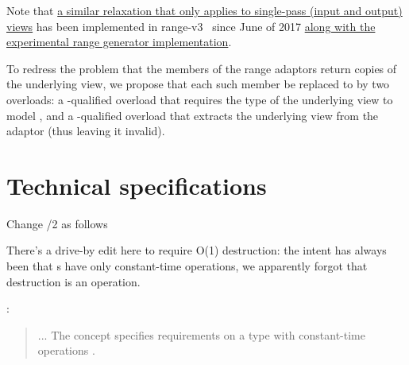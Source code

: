 Note that
\href{https://github.com/ericniebler/range-v3/commit/11fb1f0c6ef60a61a3eb264b5c3d0d42fc4615a2}{
a similar relaxation that only applies to single-pass (input and output) views}
has been implemented in range-v3~\cite{range-v3} since June of 2017
\href{https://github.com/ericniebler/range-v3/commit/d2bd910faa75d9016f6fb124f9de46c926c49c72}{
along with the experimental range generator implementation}.

To redress the problem that the  members of the range adaptors
return copies of the underlying view, we propose that each such 
member be replaced to by two overloads: a -qualified overload that
requires the type of the underlying view to model , and
a \tcode{\&\&}-qualified overload that extracts the underlying view from the
adaptor (thus leaving it invalid).


\chapter{Technical specifications}
Change /2 as follows \begin{note}There's a drive-by
edit here to require O(1) destruction: the intent has always been that
s have only constant-time operations, we apparently forgot that
destruction is an operation.\end{note}:
\begin{quote}
... The  concept specifies requirements on a  type with
constant-time  operations .
\end{quote}

